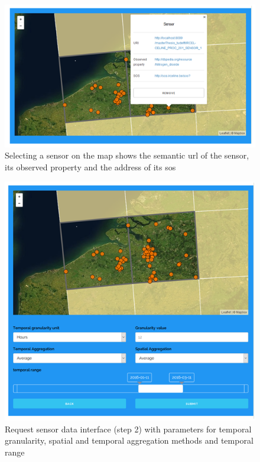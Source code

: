 \begin{figure}
	\centering
	\includegraphics[width=\linewidth]{figs/interface3.PNG}
	\caption{Selecting a sensor on the map shows the semantic \ac*{url} of the sensor, its observed property and the address of its \ac*{sos}}
	\label{fig:interface2}
\end{figure}

\begin{figure}
	\centering
	\includegraphics[width=\linewidth]{figs/interface2.PNG}
	\caption{Request sensor data interface (step 2) with parameters for temporal granularity, spatial and temporal aggregation methods and temporal range}
	\label{fig:interface3}
\end{figure}

